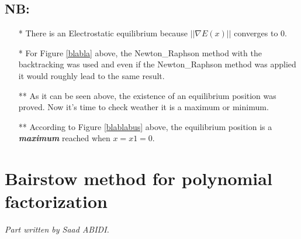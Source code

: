 \documentclass{article}
\begin{document}
\subsection*{NB:}
\begin{itemize}
\item[*]There is an Electrostatic equilibrium because $||\nabla E(x)||$ converges to 0.
  \item[*]For Figure \ref{blabla} above, the Newton\_Raphson method with the backtracking was used and even if the Newton\_Raphson method was applied it would roughly lead to the same result. 
\end{itemize}
\begin{itemize}
\item[**]As it can be seen above, the existence of an equilibrium position was proved. Now it's time to check weather it is a maximum or minimum. 
\end{itemize}
\begin{itemize}
\item[**]According to Figure \ref{blablabus} above, the equilibrium position is a \emph{\textbf{maximum}} reached when $x=x1=0$.
\end{itemize}



\section{Bairstow method for polynomial factorization}
\textit{Part written by Saad ABIDI.}\\
\end{document}
